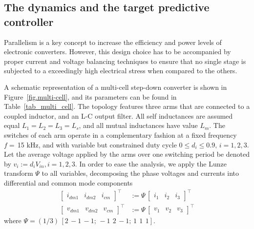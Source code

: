 \subsection{The dynamics and the target predictive controller}
\label{sec:analysis}

Parallelism is a key concept to increase the efficiency and power levels of electronic converters. However, this design choice has to be accompanied by proper current and voltage balancing techniques to ensure that no single stage is subjected to a exceedingly high electrical stress when compared to the others. 

A schematic representation of a multi-cell step-down converter is shown in Figure~\ref{fig.multi-cell}, and its parameters can be found in Table~\ref{tab_multi_cell}. The topology features three arms that are connected to a coupled inductor, and an L-C output filter. All self inductances are assumed equal $L_1 = L_2 = L_3 = L_{s}$, and all mutual inductances have value $L_m$. The switches of each arm operate in a complementary fashion at a fixed frequency $f = \,$15 kHz, and with variable but constrained duty cycle $0 \leq d_i \leq 0.9, \, i=1,2,3$. Let the average voltage applied by the arms over one switching period be denoted by $v_i := d_i V_{in}, i=1,2,3$. In order to ease the analysis, we apply the Lunze transform $\Psi$ to all variables, decomposing the phase voltages and currents into differential and common mode components
\begin{align}
	\begin{bmatrix}i_{dm1} & i_{dm2} & i_{cm}\end{bmatrix}^\top &:= \Psi \, \begin{bmatrix}i_{1} & i_{2} & i_{3}\end{bmatrix}^\top \\
	\begin{bmatrix}v_{dm1} & v_{dm2} & v_{cm}\end{bmatrix}^\top &:= \Psi \, \begin{bmatrix}v_{1} & v_{2} & v_{3}\end{bmatrix}^\top
\end{align}
where $\Psi = (1/3) \, [2 \, -1 \, -1; \, -1 \ \, 2 \, -1; \, 1 \ \, 1 \ \, 1]$.

